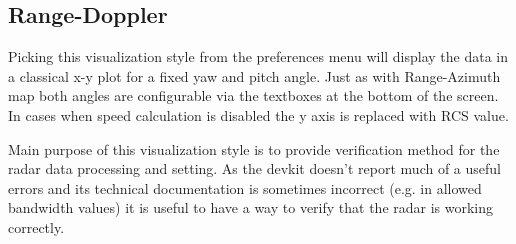 \subsection{Range-Doppler}

Picking this visualization style from the preferences menu will display the data in a classical x-y plot for a fixed yaw and pitch angle.
Just as with Range-Azimuth map both angles are configurable via the textboxes at the bottom of the screen.
In cases when speed calculation is disabled the y axis is replaced with RCS value.

Main purpose of this visualization style is to provide verification method for the radar data processing and setting.
As the devkit doesn't report much of a useful errors and its technical documentation is sometimes incorrect (e.g. in allowed bandwidth values) it is useful to have a way to verify that the radar is working correctly.

